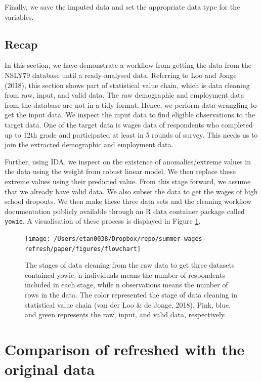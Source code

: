 \documentclass{article}
\begin{document}
Finally, we save the imputed data and set the appropriate data type for the variables.

\hypertarget{recap}{%
\subsection{Recap}\label{recap}}

In this section, we have demonstrate a workflow from getting the data from the NSLY79 database until a ready-analysed data. Referring to Loo and Jonge (2018), this section shows part of statistical value chain, which is data cleaning from raw, input, and valid data. The raw demographic and employment data from the database are not in a tidy format. Hence, we perform data wrangling to get the input data. We inspect the input data to find eligible observations to the target data. One of the target data is wages data of respondents who completed up to 12th grade and participated at least in 5 rounds of survey. This needs us to join the extracted demographic and employment data.

Further, using IDA, we inspect on the existence of anomalies/extreme values in the data using the weight from robust linear model. We then replace these extreme values using their predicted value.
From this stage forward, we assume that we already have valid data. We also subset the data to get the wages of high school dropouts. We then make these three data sets and the cleaning workflow documentation publicly available through an R data container package called \texttt{yowie}. A visualisation of these process is displayed in Figure \ref{fig:flow-chart}.

\begin{figure}

{\centering \texttt{[image: /Users/etan0038/Dropbox/repo/summer-wages-refresh/paper/figures/flowchart]} 

}

\caption{The stages of data cleaning from the raw data to get three datasets contained yowie. n individuals means the number of respondents included in each stage, while n observations means the number of rows in the data. The color represented the stage of data cleaning in statistical value chain (van der Loo \& de Jonge, 2018). Pink, blue, and green represents the raw, input, and valid data, respectively.}\label{fig:flow-chart}
\end{figure}

\hypertarget{compare}{%
\section{Comparison of refreshed with the original data}\label{compare}}
\end{document}

